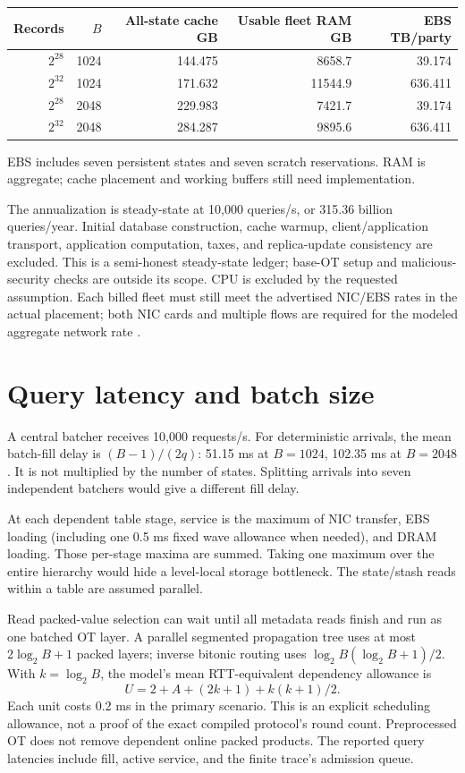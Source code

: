 \documentclass[11pt]{article}
\begin{document}
\begin{center}\footnotesize
\begin{tabular}{rrrrr}\toprule
Records & $B$ & All-state cache GB & Usable fleet RAM GB & EBS TB/party\\\midrule
$2^{28}$ & 1024 & 144.475 & 8658.7 & 39.174\\
$2^{32}$ & 1024 & 171.632 & 11544.9 & 636.411\\
$2^{28}$ & 2048 & 229.983 & 7421.7 & 39.174\\
$2^{32}$ & 2048 & 284.287 & 9895.6 & 636.411\\
\bottomrule\end{tabular}\end{center}
{\footnotesize EBS includes seven persistent states and seven scratch reservations. RAM is aggregate; cache placement and working buffers still need implementation.\par}

The annualization is steady-state at 10,000 queries/s, or 315.36 billion
queries/year. Initial database construction, cache warmup, client/application
transport, application computation, taxes, and replica-update consistency
are excluded. This is a semi-honest steady-state ledger; base-OT setup and
malicious-security checks are outside its scope. CPU is excluded by the
requested assumption. Each billed
fleet must still meet the advertised NIC/EBS rates in the actual placement;
both NIC cards and multiple flows are required for the modeled aggregate
network rate \cite{aws-network}.

\section{Query latency and batch size}
A central batcher receives 10,000 requests/s. For deterministic arrivals,
the mean batch-fill delay is $(B-1)/(2q)$: 51.15 ms at $B=1024$, 102.35 ms
at $B=2048$. It is not multiplied by the number of states. Splitting arrivals
into seven independent batchers would give a different fill delay.

At each dependent table stage, service is the maximum of NIC transfer,
EBS loading (including one 0.5 ms fixed wave allowance when needed), and
DRAM loading. Those per-stage maxima are summed. Taking one maximum over
the entire hierarchy would hide a level-local storage bottleneck. The
state/stash reads within a table are assumed parallel.

Read packed-value selection can wait until all metadata reads finish and
run as one batched OT layer. A parallel segmented propagation tree uses
at most $2\log_2B+1$ packed layers; inverse bitonic routing uses
$\log_2B(\log_2B+1)/2$. With $k=\log_2B$, the model's mean
RTT-equivalent dependency allowance is
\[
 U=2+A+(2k+1)+k(k+1)/2.
\]
Each unit costs 0.2 ms in the primary scenario. This is an explicit
scheduling allowance, not a proof of the exact compiled protocol's round
count. Preprocessed OT does not remove dependent online packed products.
The reported query latencies include fill, active service, and the finite
trace's admission queue.
\end{document}
